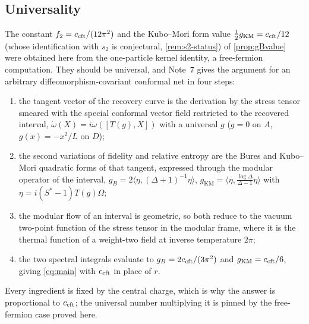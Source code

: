 \label{sec:outlook}
\subsection{Universality}
The constant $f_2=c_{\rm cft}/(12\pi^2)$ and the Kubo--Mori form value $\frac12g_{\rm KM}=c_{\rm cft}/12$ (whose identification with $s_2$ is conjectural, \cref{rem:s2-status}) of
\cref{prop:gBvalue} were obtained here from the one-particle kernel identity, a
free-fermion computation.  They should be universal, and Note~7 \cite{Note7} gives
the argument for an arbitrary diffeomorphism-covariant conformal net in four
steps:
\begin{enumerate}[label=(\arabic*),leftmargin=2.2em]
\item the tangent vector of the recovery curve is the derivation by the stress
tensor smeared with the special conformal vector field restricted to the recovered
interval, $\dot\omega(X)=i\omega([T(g),X])$ with a universal $g$
($g=0$ on $A$, $g(x)=-x^2/L$ on $D$);
\item the second variations of fidelity and relative entropy are the Bures and
Kubo--Mori quadratic forms of that tangent, expressed through the modular operator
of the interval,
$g_B=2\langle\eta,(\Delta+1)^{-1}\eta\rangle$,
$g_{\mathrm{KM}}=\langle\eta,\frac{\log\Delta}{\Delta-1}\eta\rangle$ with
$\eta=i(S^*-1)T(g)\Omega$;
\item the modular flow of an interval is geometric, so both reduce to the vacuum
two-point function of the stress tensor in the modular frame, where it is the
thermal function of a weight-two field at inverse temperature $2\pi$;
\item the two spectral integrals evaluate to $g_B=2c_{\rm cft}/(3\pi^2)$ and
$g_{\mathrm{KM}}=c_{\rm cft}/6$, giving \eqref{eq:main} with $c_{\rm cft}$ in
place of $r$.
\end{enumerate}
Every ingredient is fixed by the central charge, which is why the answer is
proportional to $c_{\rm cft}$; the universal number multiplying it is pinned by
the free-fermion case proved here.

